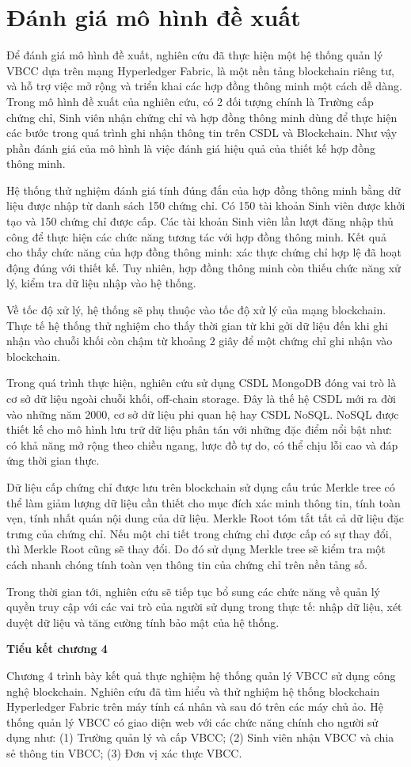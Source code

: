 \section{Đánh giá mô hình đề xuất}

Để đánh giá mô hình đề xuất, nghiên cứu đã thực hiện một hệ thống quản lý VBCC dựa trên mạng Hyperledger Fabric, là một nền tảng blockchain riêng tư, và hỗ trợ việc mở rộng và triển khai các hợp đồng thông minh một cách dễ dàng. Trong mô hình đề xuất của nghiên cứu, có 2 đối tượng chính là Trường cấp chứng chỉ, Sinh viên nhận chứng chỉ và hợp đồng thông minh dùng để thực hiện các bước trong quá trình ghi nhận thông tin trên CSDL và Blockchain. Như vậy phần đánh giá của mô hình là việc đánh giá hiệu quả của thiết kế hợp đồng thông minh.

Hệ thống thử nghiệm đánh giá tính đúng đắn của hợp đồng thông minh bằng dữ liệu được nhập từ danh sách 150 chứng chỉ. Có 150 tài khoản Sinh viên được khởi tạo và 150 chứng chỉ được cấp. Các tài khoản Sinh viên lần lượt đăng nhập thủ công để thực hiện các chức năng tương tác với hợp đồng thông minh. Kết quả cho thấy chức năng của hợp đồng thông minh: xác thực chứng chỉ hợp lệ đã hoạt động đúng với thiết kế. Tuy nhiên, hợp đồng thông minh còn thiếu chức năng xử lý, kiểm tra dữ liệu nhập vào hệ thống.

Về tốc độ xử lý, hệ thống sẽ phụ thuộc vào tốc độ xử lý của mạng blockchain. Thực tế hệ thống thử nghiệm cho thấy thời gian từ khi gởi dữ liệu đến khi ghi nhận vào chuỗi khối còn chậm từ khoảng 2 giây để một chứng chỉ ghi nhận vào blockchain.

Trong quá trình thực hiện, nghiên cứu sử dụng CSDL MongoDB đóng vai trò là cơ sở dữ liệu ngoài chuỗi khối, off-chain storage. Đây là thế hệ CSDL mới ra đời vào những năm 2000, cơ sở dữ liệu phi quan hệ hay CSDL NoSQL. NoSQL được thiết kế cho mô hình lưu trữ dữ liệu phân tán với những đặc điểm nổi bật như: có khả năng mở rộng theo chiều ngang, lược đồ tự do, có thể chịu lỗi cao và đáp ứng thời gian thực.

Dữ liệu cấp chứng chỉ được lưu trên blockchain sử dụng cấu trúc Merkle tree có thể làm giảm lượng dữ liệu cần thiết cho mục đích xác minh thông tin, tính toàn vẹn, tính nhất quán nội dung của dữ liệu. Merkle Root tóm tắt tất cả dữ liệu đặc trưng của chứng chỉ. Nếu một chi tiết trong chứng chỉ được cấp có sự thay đổi, thì Merkle Root cũng sẽ thay đổi. Do đó sử dụng Merkle tree sẽ kiểm tra một cách nhanh chóng tính toàn vẹn thông tin của chứng chỉ trên nền tảng số.



Trong thời gian tới, nghiên cứu sẽ tiếp tục  bổ sung các chức năng về quản lý quyền truy cập  với các vai trò của người sử dụng trong thực tế: nhập dữ liệu, xét duyệt dữ liệu và tăng cường tính bảo mật của hệ thống.

\textbf{Tiểu kết chương 4}

Chương 4 trình bày kết quả thực nghiệm hệ thống quản lý VBCC sử dụng công nghệ blockchain. Nghiên cứu đã tìm hiểu và thử nghiệm hệ thống blockchain Hyperledger Fabric trên máy tính cá nhân và sau đó trên các máy chủ ảo. Hệ thống quản lý VBCC có giao diện web với các chức năng chính cho người sử dụng như: (1) Trường quản lý và cấp VBCC; (2) Sinh viên nhận VBCC và chia sẻ thông tin VBCC; (3) Đơn vị xác thực VBCC. 
